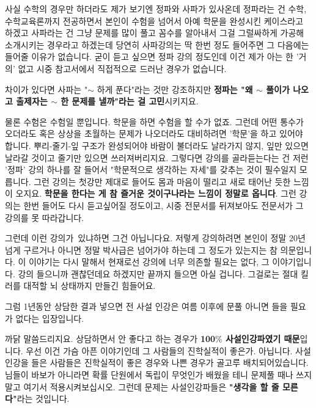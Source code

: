 사실 수학의 경우만 하더라도 제가 보기엔 정파와 사파가 있사온데
정파라는 건 수학, 수학교육론까지 전공하면서 본인이 수험을 넘어서 아예 학문을 완성시킨 케이스라고 하겠고
사파라는 건 그냥 문제를 많이 풀고 꼼수를 알아내서 그걸 그럴싸하게 가공해 소개시키는 경우라고 하겠는데
당연히 사파강의는 딱 한번 정도 들어주면 그 다음에는 들어줄 이유가 없습니다.
굳이 듣고 싶으면 정파 강의 정도인데 이건 제가 아는 한 '거의' 없고 시중 참고서에서 직접적으로 드러난 경우가 없습니다.
\vspace{5mm}

차이가 있다면 사파는 "$\sim$ 하게 푼다"라는 것만 강조하지만 \textbf{정파는 "왜 $\sim$ 풀이가 나오고 출제자는 $\sim$ 한 문제를 낼까"라는 걸 고민}시키지요.
\vspace{5mm}

물론 수험은 수험일 뿐입니다. 학문을 하면 수험을 할 수가 없죠.
그런데 어떤 통수가 오더라도 혹은 상상을 초월하는 문제가 나오더라도 대비하려면 '학문'을 하고 있어야 합니다.
뿌리-줄기-잎 구조가 완성되어야 바람이 불더라도 날라가지 않지, 잎만 있으면 날라갈 것이고 줄기만 있으면 쓰러져버리지요.
그렇다면 강의를 골라듣는다는 건 저런 '정파' 강의 하나를 잘 들어서 "학문적으로 생각하는 자세"를 갖추는 것이 필수일지 모릅니다.
그런 강의는 첫강만 제대로 들어도 몸과 마음이 떨리고 새로 태어난 듯한 느낌이 오지요.
\textbf{학문을 한다는 게 참 즐거운 것이구나라는 느낌이 정말로 옵니다}.
그런 강의는 한번 들어도 다시 듣고싶어질 정도이고, 시중 전문서를 뒤져보아도 전문서가 그 강의를 못 따라갑니다.
\vspace{5mm}

그런데 이런 강의가 있냐하면 그건 아닙니다요.
저렇게 강의하려면 본인이 정말 20년 넘게 구르거나 아니면 정말 박사급은 넘어가야 하는데 그 정도가 있는지는 참 의문입니다.
이 이야기는 다시 말해서 현재로선 강의에 너무 의존할 필요는 없다, 그 이야기입니다.
강의 들으니까 괜찮던데요 하겠지만 끝까지 들으면 아실 겁니다. 그걸로는 절대 킬러를 대적할 뇌 상태까지 만들긴 힘들어요.
\vspace{5mm}

그럼 1년동안 상담한 결과 넣으면 전 사설 인강은 여름 이후에 문풀 아니면 들을 필요가 없다는 입장입니다.
\vspace{5mm}

까닭 말씀드리지요. 상담하면서 안 좋다고 하는 경우가 \textbf{100$\%$ 사설인강파였기 때문}입니다.
우선 이건 가슴 아픈 이야기인데 그 사람들의 진학실적이 좋은가. 아닙니다.
사설인강을 들은 사람들은 진학실적이 좋은 경우와 나쁜 경우가 골고루 배치되어있습니다.
님들이 바보가 아니라면 확률 단원에서 독립이 무엇인가 배웠을 테니 문제풀 때나 쓰지 말고 여기서 적용시켜보십시오.
그런데 문제는 사설인강파들은 \textbf{"생각을 할 줄 모른다"}라는 것입니다.
\vspace{5mm}

